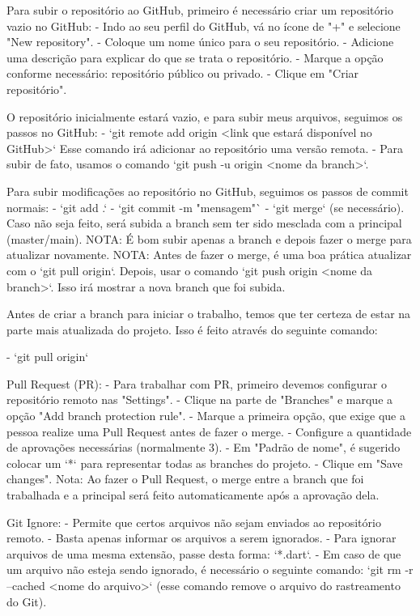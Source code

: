 Para subir o repositório ao GitHub, primeiro é necessário criar um repositório vazio no GitHub:
 - Indo ao seu perfil do GitHub, vá no ícone de "+" e selecione "New repository".
 - Coloque um nome único para o seu repositório.
 - Adicione uma descrição para explicar do que se trata o repositório.
 - Marque a opção conforme necessário: repositório público ou privado.
 - Clique em "Criar repositório".

O repositório inicialmente estará vazio, e para subir meus arquivos, seguimos os passos no GitHub:
 - `git remote add origin <link que estará disponível no GitHub>`
   Esse comando irá adicionar ao repositório uma versão remota.
 - Para subir de fato, usamos o comando `git push -u origin <nome da branch>`.

Para subir modificações ao repositório no GitHub, seguimos os passos de commit normais:
    - `git add .`
    - `git commit -m "mensagem"`
    - `git merge` (se necessário). Caso não seja feito, será subida a branch sem ter sido mesclada com a principal (master/main).
    NOTA: É bom subir apenas a branch e depois fazer o merge para atualizar novamente.
    NOTA: Antes de fazer o merge, é uma boa prática atualizar com o `git pull origin`.
    Depois, usar o comando `git push origin <nome da branch>`.
    Isso irá mostrar a nova branch que foi subida.

Antes de criar a branch para iniciar o trabalho, temos que ter certeza de estar na parte
mais atualizada do projeto. Isso é feito através do seguinte comando:

   - `git pull origin`

Pull Request (PR):
   - Para trabalhar com PR, primeiro devemos configurar o repositório remoto nas "Settings".
   - Clique na parte de "Branches" e marque a opção "Add branch protection rule".
   - Marque a primeira opção, que exige que a pessoa realize uma Pull Request antes de fazer o merge.
   - Configure a quantidade de aprovações necessárias (normalmente 3).
   - Em "Padrão de nome", é sugerido colocar um `*` para representar todas as branches do projeto.
   - Clique em "Save changes".
   Nota: Ao fazer o Pull Request, o merge entre a branch que foi trabalhada e a principal será feito automaticamente
   após a aprovação dela.

Git Ignore:
   - Permite que certos arquivos não sejam enviados ao repositório remoto.
   - Basta apenas informar os arquivos a serem ignorados.
   - Para ignorar arquivos de uma mesma extensão, passe desta forma: `*.dart`.
   - Em caso de que um arquivo não esteja sendo ignorado, é necessário o seguinte comando:
      `git rm -r --cached <nome do arquivo>` (esse comando remove o arquivo do rastreamento do Git).